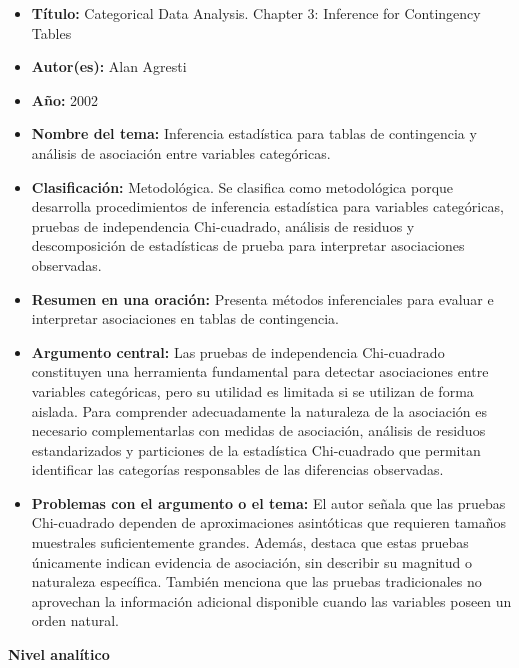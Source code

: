 \documentclass[12pt]{article}
\begin{document}
\begin{itemize}
\item \textbf{Título:} Categorical Data Analysis. Chapter 3: Inference for Contingency Tables
\item \textbf{Autor(es):} Alan Agresti
\item \textbf{Año:} 2002
\item \textbf{Nombre del tema:} Inferencia estadística para tablas de contingencia y análisis de asociación entre 
variables categóricas.

\item \textbf{Clasificación:} Metodológica. Se clasifica como metodológica porque desarrolla procedimientos de 
inferencia estadística para variables categóricas, pruebas de independencia Chi-cuadrado, análisis de residuos y 
descomposición de estadísticas de prueba para interpretar asociaciones observadas.

\item \textbf{Resumen en una oración:} Presenta métodos inferenciales para evaluar e interpretar asociaciones en 
tablas de contingencia.

\item \textbf{Argumento central:} Las pruebas de independencia Chi-cuadrado constituyen una herramienta fundamental para 
detectar asociaciones entre variables categóricas, pero su utilidad es limitada si se utilizan de forma aislada. 
Para comprender adecuadamente la naturaleza de la asociación es necesario complementarlas con medidas de asociación, 
análisis de residuos estandarizados y particiones de la estadística Chi-cuadrado que permitan 
identificar las categorías responsables de las diferencias observadas.

\item \textbf{Problemas con el argumento o el tema:} El autor señala que las pruebas Chi-cuadrado dependen de 
aproximaciones asintóticas que requieren tamaños muestrales suficientemente grandes. Además, destaca que estas 
pruebas únicamente indican evidencia de asociación, sin describir su magnitud o naturaleza específica. 
También menciona que las pruebas tradicionales no aprovechan la información adicional disponible cuando 
las variables poseen un orden natural.\\

\end{itemize}

\textbf{Nivel analítico}
\end{document}
